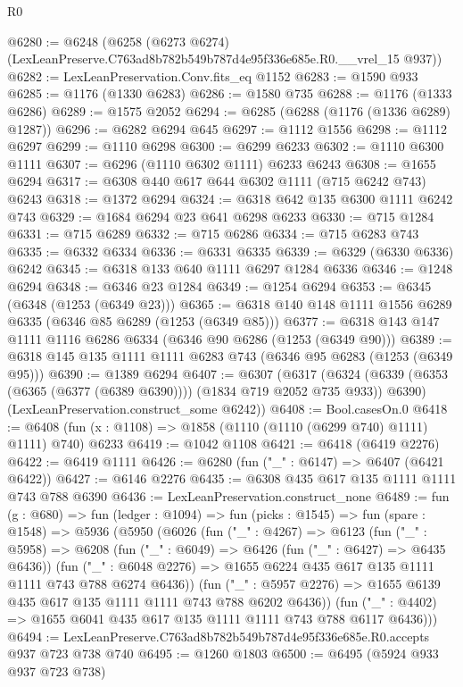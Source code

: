 \begin{lexlean}{R0}
\begin{coremodule}
@6280 := @6248
    (@6258 (@6273 @6274) (LexLeanPreserve.C763ad8b782b549b787d4e95f336e685e.R0.__vrel_15 @937))
@6282 := LexLeanPreservation.Conv.fits_eq @1152
@6283 := @1590 @933
@6285 := @1176 (@1330 @6283)
@6286 := @1580 @735
@6288 := @1176 (@1333 @6286)
@6289 := @1575 @2052
@6294 := @6285 (@6288 (@1176 (@1336 @6289) @1287))
@6296 := @6282 @6294 @645
@6297 := @1112 @1556
@6298 := @1112 @6297
@6299 := @1110 @6298
@6300 := @6299 @6233
@6302 := @1110 @6300 @1111
@6307 := @6296 (@1110 @6302 @1111) @6233 @6243
@6308 := @1655 @6294
@6317 := @6308 @440 @617 @644 @6302 @1111 (@715 @6242 @743) @6243
@6318 := @1372 @6294
@6324 := @6318 @642 @135 @6300 @1111 @6242 @743
@6329 := @1684 @6294 @23 @641 @6298 @6233
@6330 := @715 @1284
@6331 := @715 @6289
@6332 := @715 @6286
@6334 := @715 @6283 @743
@6335 := @6332 @6334
@6336 := @6331 @6335
@6339 := @6329 (@6330 @6336) @6242
@6345 := @6318 @133 @640 @1111 @6297 @1284 @6336
@6346 := @1248 @6294
@6348 := @6346 @23 @1284
@6349 := @1254 @6294
@6353 := @6345 (@6348 (@1253 (@6349 @23)))
@6365 := @6318 @140 @148 @1111 @1556 @6289 @6335 (@6346 @85 @6289 (@1253 (@6349 @85)))
@6377 := @6318 @143 @147 @1111 @1116 @6286 @6334 (@6346 @90 @6286 (@1253 (@6349 @90)))
@6389 := @6318 @145 @135 @1111 @1111 @6283 @743 (@6346 @95 @6283 (@1253 (@6349 @95)))
@6390 := @1389 @6294
@6407 := @6307
    (@6317
      (@6324 (@6339 (@6353 (@6365 (@6377 (@6389 @6390)))) (@1834 @719 @2052 @735 @933)) @6390)
      (LexLeanPreservation.construct_some @6242))
@6408 := Bool.casesOn.{0}
@6418 := @6408 (fun (x : @1108) => @1858 (@1110 (@1110 (@6299 @740) @1111) @1111) @740) @6233
@6419 := @1042 @1108
@6421 := @6418 (@6419 @2276)
@6422 := @6419 @1111
@6426 := @6280 (fun ("_" : @6147) => @6407 (@6421 @6422))
@6427 := @6146 @2276
@6435 := @6308 @435 @617 @135 @1111 @1111 @743 @788 @6390
@6436 := LexLeanPreservation.construct_none
@6489 := fun (g : @680) =>
  fun (ledger : @1094) =>
  fun (picks : @1545) =>
  fun (spare : @1548) =>
  @5936
    (@5950
      (@6026
        (fun ("_" : @4267) =>
        @6123
          (fun ("_" : @5958) =>
          @6208
            (fun ("_" : @6049) => @6426 (fun ("_" : @6427) => @6435 @6436))
            (fun ("_" : @6048 @2276) =>
            @1655 @6224 @435 @617 @135 @1111 @1111 @743 @788 @6274 @6436))
          (fun ("_" : @5957 @2276) => @1655 @6139 @435 @617 @135 @1111 @1111 @743 @788 @6202 @6436))
        (fun ("_" : @4402) => @1655 @6041 @435 @617 @135 @1111 @1111 @743 @788 @6117 @6436)))
@6494 := LexLeanPreserve.C763ad8b782b549b787d4e95f336e685e.R0.accepts @937 @723 @738 @740
@6495 := @1260 @1803
@6500 := @6495 (@5924 @933 @937 @723 @738)

\end{coremodule}
\end{lexlean}
